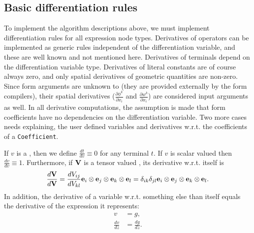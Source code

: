 \subsection{Basic differentiation rules}

To implement the algorithm descriptions above, we must implement
differentiation rules for all expression node types. Derivatives of
operators can be implemented as generic rules independent of the
differentiation variable, and these are well known and not mentioned
here. Derivatives of terminals depend on the differentiation variable
type.  Derivatives of literal constants are of course always zero, and
only spatial derivatives of geometric quantities are non-zero.  Since
form arguments are unknown to \ufl{} (they are provided externally by
the form compilers), their spatial derivatives ($\frac{\partial
  \phi^k}{\partial x_i}$ and $\frac{\partial w^k}{\partial x_i}$) are
considered input arguments as well.  In all derivative computations,
the assumption is made that form coefficients have no dependencies on
the differentiation variable.  Two more cases needs explaining, the
user defined variables and derivatives w.r.t. the coefficients of a
\texttt{Coefficient}.

If $v$ is a , then we define $\frac{d t}{d v} \equiv
0$ for any terminal $t$. If $v$ is scalar valued then $\frac{d v}{d v}
\equiv 1$. Furthermore, if $\mathbf{V}$ is a tensor valued ,
its derivative w.r.t. itself is
\begin{align}
\frac{d \mathbf{V}}{d \mathbf{V}}
    =
    \frac{d V_{ij}}{d V_{kl}}
    \mathbf{e}_i\otimes\mathbf{e}_j\otimes\mathbf{e}_k\otimes\mathbf{e}_l
    =
    \delta_{ik}\delta_{jl}
    \mathbf{e}_i\otimes\mathbf{e}_j\otimes\mathbf{e}_k\otimes\mathbf{e}_l .
\end{align}
In addition, the derivative of a variable w.r.t. something else than
itself equals the derivative of the expression it represents:
\begin{align}
v &= g, \\
\frac{d v}{d z} &= \frac{d g}{d z}.
\end{align}

